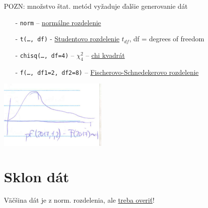 \documentclass[unknownkeysallowed]{article}
\begin{document}
POZN: množstvo štat. metód vyžaduje ďalšie generovanie dát
\begin{multicols}{2}
\begin{itemize}
\item[-] \texttt{norm} -- \underline{normálne rozdelenie}
\item[-] \texttt{t(\ldots, df)} - \underline{Studentovo rozdelenie} $t_{df}$, df = degrees of freedom
\item[-] \texttt{chisq(\ldots, df=4)} -- $\chi_4^2$ -- \underline{chi kvadrát}
\item[-] \texttt{f(\ldots, df1=2, df2=8)} -- \underline{Fischerovo-Schnedekerovo rozdelenie}
\end{itemize}
\columnbreak
\includegraphics[width=0.7\linewidth]{imgs/obr10.png}
\end{multicols}

\section*{Sklon dát}
Väčšina dát je z norm. rozdelenia, ale \underline{treba overiť}!
\end{document}
